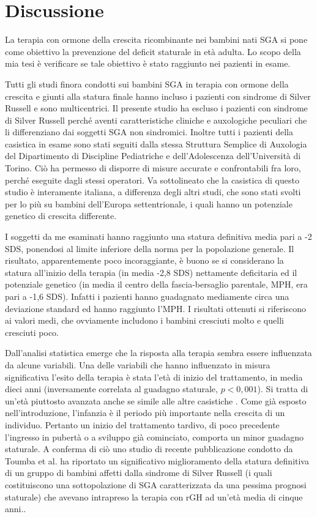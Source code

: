 \chapter{Discussione}

La terapia con ormone della crescita ricombinante nei bambini nati SGA si pone come obiettivo la prevenzione del deficit staturale in età adulta.
Lo scopo della mia tesi è verificare se tale obiettivo è stato raggiunto nei pazienti in esame.

Tutti gli studi finora condotti sui bambini SGA in terapia con ormone della crescita e giunti alla statura finale hanno incluso i pazienti con sindrome di Silver Russell e sono multicentrici. Il presente studio ha escluso i pazienti con sindrome di Silver Russell perché aventi caratteristiche cliniche e auxologiche peculiari che li differenziano dai soggetti SGA non sindromici. Inoltre tutti i pazienti della casistica in esame sono stati seguiti dalla stessa Struttura Semplice di Auxologia del Dipartimento di Discipline Pediatriche e dell'Adolescenza dell'Università  di Torino. Ciò ha permesso di disporre di misure accurate e confrontabili fra loro, perché eseguite dagli stessi operatori. Va sottolineato che la casistica di questo studio è interamente italiana, a differenza degli altri studi, che sono stati svolti per lo più su bambini dell'Europa settentrionale, i quali hanno un potenziale genetico di crescita differente.

I soggetti da me esaminati hanno raggiunto una statura definitiva media pari a -2 SDS, ponendosi al limite inferiore della norma per la popolazione generale. Il risultato, apparentemente poco incoraggiante, è buono se si considerano la statura all'inizio della terapia (in media -2,8 SDS) nettamente deficitaria ed il potenziale genetico (in media il centro della fascia-bersaglio parentale, MPH, era pari a -1,6 SDS). Infatti i pazienti hanno guadagnato mediamente circa una deviazione standard ed hanno raggiunto l'MPH. I risultati ottenuti si riferiscono ai valori medi, che ovviamente includono i bambini cresciuti molto e quelli cresciuti poco. 

Dall'analisi statistica emerge che la risposta alla terapia sembra essere influenzata da alcune variabili.
Una delle variabili che hanno influenzato in misura significativa l'esito della terapia è stata l'età di inizio del trattamento, in media dieci anni (inversamente correlata al guadagno staturale, $p < 0,001$). Si tratta di un'età piuttosto avanzata anche se simile alle altre casistiche\cite{coutant1998short} \cite{zucchini2001final}. Come già esposto nell'introduzione, l'infanzia è il periodo più importante nella crescita di un individuo. Pertanto un inizio del trattamento tardivo, di poco precedente l'ingresso in pubertà o a sviluppo già cominciato, comporta un minor guadagno staturale. A conferma di ciò uno studio di recente pubblicazione condotto da Toumba et al. ha riportato un significativo miglioramento della statura definitiva di un gruppo di bambini affetti dalla sindrome di Silver Russell (i quali costituiscono una sottopolazione di SGA caratterizzata da una pessima prognosi staturale) che avevano intrapreso la terapia con rGH ad un'età media di cinque anni.\cite{toumba2010effect}. 

